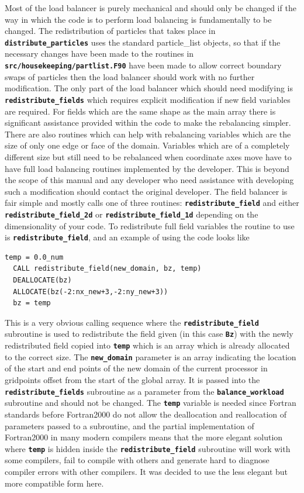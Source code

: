 \documentclass[12pt,a4paper]{article}
\newcommand{\simpleboxverbatim}{\begin{Verbatim}[obeytabs=true,frame=single,
  framerule=0.5mm,rulecolor=\color{warwickmid},formatcom=\color{black}]}
\newcommand{\inlinecode}[1]{{\color{warwickred} \bf\texttt{#1}}}
\begin{document}
Most of the load balancer is purely mechanical and should only be changed if
the way in which the code is to perform load balancing is fundamentally to be
changed. The redistribution of particles that takes place in
\inlinecode{distribute\_particles} uses the standard particle\_list objects, so
that if the necessary changes have been made to the routines in
\inlinecode{src/housekeeping/partlist.F90} have been made to allow correct
boundary swaps of particles then the load balancer should work with no further
modification. The only part of the load balancer which should need modifying is
\inlinecode{redistribute\_fields} which requires explicit modification if new
field variables are required. For fields which are the same shape as the main
array there is significant assistance provided within the code to make the
rebalancing simpler. There are also routines which can help with rebalancing
variables which are the size of only one edge or face of the domain. Variables
which are of a completely different size but still need to be rebalanced when
coordinate axes move have to have full load balancing routines implemented by
the developer. This is beyond the scope of this manual and any developer who
need assistance with developing such a modification should contact the original
developer. The field balancer is fair simple and mostly calls one of three
routines: \inlinecode{redistribute\_field} and either
\inlinecode{redistribute\_field\_2d} or \inlinecode{redistribute\_field\_1d}
depending on the dimensionality of your code. To redistribute full field
variables the routine to use is \inlinecode{redistribute\_field}, and an
example of using the code looks like

\simpleboxverbatim
  temp = 0.0_num
  CALL redistribute_field(new_domain, bz, temp)
  DEALLOCATE(bz)
  ALLOCATE(bz(-2:nx_new+3,-2:ny_new+3))
  bz = temp
\end{Verbatim}

This is a very obvious calling sequence where the
\inlinecode{redistribute\_field} subroutine is used to redistribute the field
given (in this case \inlinecode{Bz}) with the newly redistributed field copied
into \inlinecode{temp} which is an array which is already allocated to the
correct size. The \inlinecode{new\_domain} parameter is an array indicating the
location of the start and end points of the new domain of the current processor
in gridpoints offset from the start of the global array. It is passed into the
\inlinecode{redistribute\_fields} subroutine as a parameter from the
\inlinecode{balance\_workload} subroutine and should not be changed. The
\inlinecode{temp} variable is needed since Fortran standards before Fortran2000
do not allow the deallocation and reallocation of parameters passed to a
subroutine, and the partial implementation of Fortran2000 in many modern
compilers means that the more elegant solution where \inlinecode{temp} is
hidden inside the \inlinecode{redistribute\_field} subroutine will work with
some compilers, fail to compile with others and generate hard to diagnose
compiler errors with other compilers. It was decided to use the less elegant
but more compatible form here.\\
\end{document}
